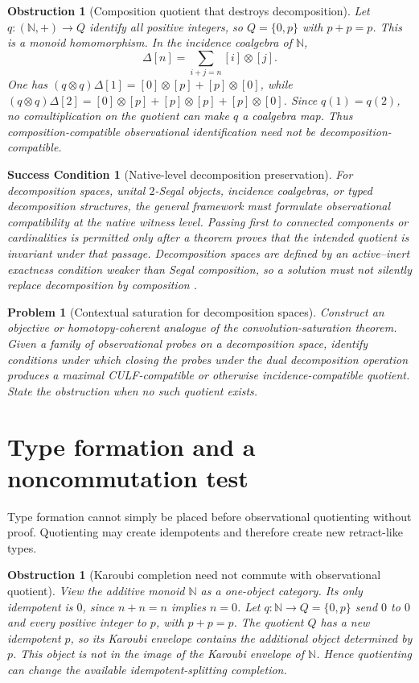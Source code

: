 \documentclass[11pt]{article}
\newtheorem{condition}[theorem]{Success Condition}
\newtheorem{problem}[theorem]{Problem}
\newtheorem{obstruction}[theorem]{Obstruction}
\theoremstyle{definition}
\theoremstyle{remark}
\begin{document}
\begin{obstruction}[Composition quotient that destroys decomposition]
Let $q:(\mathbb N,+)\to Q$ identify all positive integers, so $Q=\{0,p\}$ with $p+p=p$. This is a monoid homomorphism. In the incidence coalgebra of $\mathbb N$,
\[
\Delta[n]=\sum_{i+j=n}[i]\otimes[j].
\]
One has $(q\otimes q)\Delta[1]=[0]\otimes[p]+[p]\otimes[0]$, while $(q\otimes q)\Delta[2]=[0]\otimes[p]+[p]\otimes[p]+[p]\otimes[0]$. Since $q(1)=q(2)$, no comultiplication on the quotient can make $q$ a coalgebra map. Thus composition-compatible observational identification need not be decomposition-compatible.
\end{obstruction}

\begin{condition}[Native-level decomposition preservation]
For decomposition spaces, unital $2$-Segal objects, incidence coalgebras, or typed decomposition structures, the general framework must formulate observational compatibility at the native witness level. Passing first to connected components or cardinalities is permitted only after a theorem proves that the intended quotient is invariant under that passage. Decomposition spaces are defined by an active--inert exactness condition weaker than Segal composition, so a solution must not silently replace decomposition by composition \cite{GKT2018}.
\end{condition}

\begin{problem}[Contextual saturation for decomposition spaces]
Construct an objective or homotopy-coherent analogue of the convolution-saturation theorem. Given a family of observational probes on a decomposition space, identify conditions under which closing the probes under the dual decomposition operation produces a maximal CULF-compatible or otherwise incidence-compatible quotient. State the obstruction when no such quotient exists.
\end{problem}

\section{Type formation and a noncommutation test}

Type formation cannot simply be placed before observational quotienting without proof. Quotienting may create idempotents and therefore create new retract-like types.

\begin{obstruction}[Karoubi completion need not commute with observational quotient]
View the additive monoid $\mathbb N$ as a one-object category. Its only idempotent is $0$, since $n+n=n$ implies $n=0$. Let $q:\mathbb N\to Q=\{0,p\}$ send $0$ to $0$ and every positive integer to $p$, with $p+p=p$. The quotient $Q$ has a new idempotent $p$, so its Karoubi envelope contains the additional object determined by $p$. This object is not in the image of the Karoubi envelope of $\mathbb N$. Hence quotienting can change the available idempotent-splitting completion.
\end{obstruction}
\end{document}
